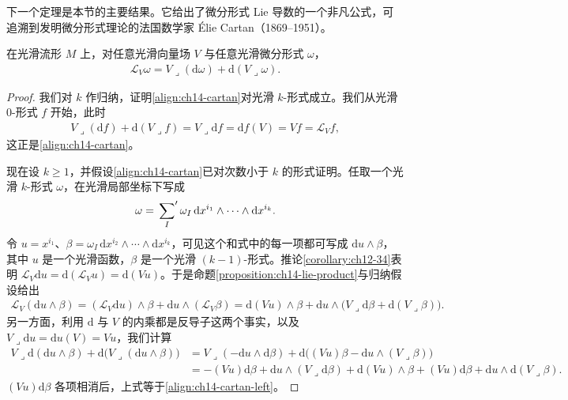 \documentclass[../../main.tex]{subfiles}
\begin{document}
下一个定理是本节的主要结果。它给出了微分形式 Lie 导数的一个非凡公式，可追溯到发明微分形式理论的法国数学家 Élie Cartan（1869--1951）。

\begin{theorem}\label{theorem:ch14-cartan}
在光滑流形 $M$ 上，对任意光滑向量场 $V$ 与任意光滑微分形式 $\omega$，
\begin{align}
\mathcal L_V\omega=V\lrcorner(\mathrm{d}\omega)+\mathrm{d}(V\lrcorner\omega).\label{align:ch14-cartan}
\end{align}
\end{theorem}

\begin{proof}
我们对 $k$ 作归纳，证明\eqref{align:ch14-cartan}对光滑 $k$-形式成立。我们从光滑 $0$-形式 $f$ 开始，此时
\begin{align*}
V\lrcorner(\mathrm{d}f)+\mathrm{d}(V\lrcorner f)=V\lrcorner\mathrm{d}f=\mathrm{d}f(V)=Vf=\mathcal L_V f,
\end{align*}
这正是\eqref{align:ch14-cartan}。

现在设 $k\geqslant1$，并假设\eqref{align:ch14-cartan}已对次数小于 $k$ 的形式证明。任取一个光滑 $k$-形式 $\omega$，在光滑局部坐标下写成
\begin{align*}
\omega=\sideset{}{'}\sum_I\omega_I\,\mathrm{d}x^{i_1}\wedge\cdots\wedge\mathrm{d}x^{i_k}.
\end{align*}
令 $u=x^{i_1}$、$\beta=\omega_I\,\mathrm{d}x^{i_2}\wedge\cdots\wedge\mathrm{d}x^{i_k}$，可见这个和式中的每一项都可写成 $\mathrm{d}u\wedge\beta$，其中 $u$ 是一个光滑函数，$\beta$ 是一个光滑 $(k-1)$-形式。推论\ref{corollary:ch12-34}表明 $\mathcal L_V\mathrm{d}u=\mathrm{d}(\mathcal L_Vu)=\mathrm{d}(Vu)$。于是命题\ref{proposition:ch14-lie-product}与归纳假设给出
\begin{align}
\mathcal L_V(\mathrm{d}u\wedge\beta)
=(\mathcal L_V\mathrm{d}u)\wedge\beta+\mathrm{d}u\wedge(\mathcal L_V\beta)
=\mathrm{d}(Vu)\wedge\beta+\mathrm{d}u\wedge\bigl(V\lrcorner\mathrm{d}\beta+\mathrm{d}(V\lrcorner\beta)\bigr).\label{align:ch14-cartan-left}
\end{align}
另一方面，利用 $\mathrm{d}$ 与 $V$ 的内乘都是反导子这两个事实，以及 $V\lrcorner\mathrm{d}u=\mathrm{d}u(V)=Vu$，我们计算
\begin{align*}
V\lrcorner\mathrm{d}(\mathrm{d}u\wedge\beta)+\mathrm{d}\bigl(V\lrcorner(\mathrm{d}u\wedge\beta)\bigr)
&=V\lrcorner(-\mathrm{d}u\wedge\mathrm{d}\beta)+\mathrm{d}\bigl((Vu)\beta-\mathrm{d}u\wedge(V\lrcorner\beta)\bigr)\\
&=-(Vu)\mathrm{d}\beta+\mathrm{d}u\wedge(V\lrcorner\mathrm{d}\beta)+\mathrm{d}(Vu)\wedge\beta+(Vu)\mathrm{d}\beta+\mathrm{d}u\wedge\mathrm{d}(V\lrcorner\beta).
\end{align*}
$(Vu)\mathrm{d}\beta$ 各项相消后，上式等于\eqref{align:ch14-cartan-left}。
\end{proof}
\end{document}
